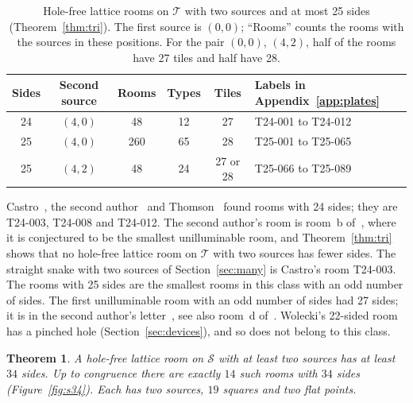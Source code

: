 \documentclass[11pt,a4paper]{article}
\theoremstyle{plain}
\newtheorem{theorem}{Theorem}[section]
\theoremstyle{definition}
\theoremstyle{remark}
\newcommand{\T}{\mathcal{T}}
\newcommand{\Sq}{\mathcal{S}}
\numberwithin{equation}{section}
\begin{document}
\begin{table}[htbp]
\centering\small
\begin{tabular}{@{}cccccl@{}}
\toprule
Sides & Second source & Rooms & Types & Tiles & Labels in Appendix~\ref{app:plates}\\
\midrule
24 & $(4,0)$ & 48 & 12 & 27 & T24-001 to T24-012\\
25 & $(4,0)$ & 260 & 65 & 28 & T25-001 to T25-065\\
25 & $(4,2)$ & 48 & 24 & 27 or 28 & T25-066 to T25-089\\
\bottomrule
\end{tabular}
\caption{Hole-free lattice rooms on $\T$ with two sources and at most 25 sides (Theorem~\ref{thm:tri}). The first source is $(0,0)$; ``Rooms'' counts the rooms with the sources in these positions. For the pair $(0,0)$, $(4,2)$, half of the rooms have 27 tiles and half have 28.}
\label{tab:tri}
\end{table}

Castro~\cite{Castro}, the second author~\cite[Figure~2]{Tok96} and Thomson~\cite{Thomson} found rooms with 24 sides; they are T24-003, T24-008 and T24-012. The second author's room is room~b of~\cite{Stewart97}, where it is conjectured to be the smallest unilluminable room, and Theorem~\ref{thm:tri} shows that no hole-free lattice room on $\T$ with two sources has fewer sides. The straight snake with two sources of Section~\ref{sec:many} is Castro's room T24-003. The rooms with 25 sides are the smallest rooms in this class with an odd number of sides. The first unilluminable room with an odd number of sides had 27 sides; it is in the second author's letter~\cite[Figure~5]{Tok96}, see also room~d of~\cite{Stewart97}. Wolecki's 22-sided room has a pinched hole (Section~\ref{sec:devices}), and so does not belong to this class.

\begin{theorem}\label{thm:sq}
A hole-free lattice room on $\Sq$ with at least two sources has at least $34$ sides. Up to congruence there are exactly $14$ such rooms with $34$ sides \textup{(}Figure~\textup{\ref{fig:s34}}\textup{)}. Each has two sources, $19$ squares and two flat points.
\end{theorem}
\end{document}
